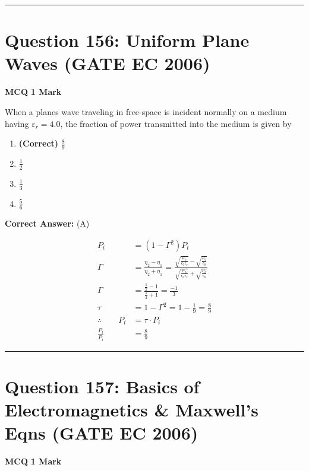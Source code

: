 \documentclass[11pt,a4paper]{article}
\begin{document}
\vspace{1.5em}
\hrule
\vspace{1.5em}

\section*{Question 156: Uniform Plane Waves (GATE EC 2006)}
\noindent \textbf{\color{primary}MCQ} \hfill \textbf{\color{secondary}1 Mark}


\noindent When a planes wave traveling in free-space is incident normally on a medium
having $\varepsilon_{r}=4.0$, the fraction of power transmitted into the medium is given by


\begin{enumerate}[label=(\Alph*)]
    \item \textbf{(Correct)} $\frac{8}{9}$
    \item $\frac{1}{2}$
    \item $\frac{1}{3}$
    \item $\frac{5}{6}$
\end{enumerate}

\noindent \textbf{Correct Answer:} (A)

\begin{tcolorbox}[solbox, title=Detailed Solution -- Question 156]
\[
\begin{aligned} P_{t}&=\left(1-\Gamma^{2}\right) P_{t} \\ \Gamma&=\frac{\eta_{2}-\eta_{1}}{\eta_{2}+\eta_{1}}=\frac{\sqrt{\frac{\mu_{0}}{\epsilon_{0} \epsilon_{r}}}-\sqrt{\frac{\mu_{0}}{\epsilon_{0}}}}{\sqrt{\frac{\mu_{0}}{\epsilon_{0} \epsilon_{r}}}+\sqrt{\frac{\mu_{0}}{\epsilon_{0}}}} \\ \Gamma&=\frac{\frac{1}{2}-1}{\frac{1}{2}+1}=\frac{-1}{3} \\ \tau&=1-\Gamma^{2}=1-\frac{1}{9}=\frac{8}{9} \\ \therefore \quad \quad P_{t}&=\tau \cdot P_{i} \\ \frac{P_{t}}{P_{i}}&=\frac{8}{9} \end{aligned}
\]
\end{tcolorbox}

\vspace{1.5em}
\hrule
\vspace{1.5em}

\section*{Question 157: Basics of Electromagnetics \& Maxwell's Eqns (GATE EC 2006)}
\noindent \textbf{\color{primary}MCQ} \hfill \textbf{\color{secondary}1 Mark}
\end{document}
